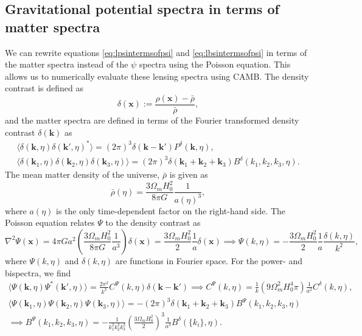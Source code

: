\documentclass[11pt]{article} %
\newcommand{\br}[1]{\ensuremath{\left( #1 \right)}}
\begin{document}
\subsection{Gravitational potential spectra in terms of matter spectra}
We can rewrite equations \ref{eq:lpsintermsofpsi} and \ref{eq:lbsintermsofpsi} in terms of the matter spectra instead of the $\psi$ spectra using the Poisson equation. This allows us to numerically evaluate these lensing spectra using CAMB. The density contrast is defined as
\begin{equation}
    \delta(\mathbf x) := \frac{\rho(\mathbf x)-\bar \rho}{\bar\rho},
\end{equation}
and the matter spectra are defined in terms of the Fourier transformed density contrast $\delta(\mathbf k)$ as 
\begin{gather*}
    \langle \delta(\mathbf k, \eta) \delta(\mathbf k', \eta)^* \rangle = (2\pi)^3\delta(\mathbf k - \mathbf k')P^\delta(\mathbf k, \eta),\\
    \langle \delta(\mathbf k_1, \eta) \delta(\mathbf k_2, \eta) \delta(\mathbf k_3, \eta) \rangle = (2\pi)^3\delta(\mathbf k_1 + \mathbf k_2 + \mathbf k_3)B^\delta(k_1, k_2, k_3, \eta).
\end{gather*}
The mean matter density of the universe, \( \bar{\rho} \) is given as 
$$
\bar{\rho}(\eta) = \frac{3 \Omega_m H_0^2}{8 \pi G}\frac{1}{a(\eta)^3},
$$
where $a(\eta)$ is the only time-dependent factor on the right-hand side.
The Poisson equation relates $\Psi$ to the density contrast as \cite{dodelson2020modern}
\begin{equation}
    \nabla^2\Psi(\mathbf x) = 4\pi G a^2\br{\frac{3\Omega_m H_0^2}{8\pi G}\frac{1}{a^3}}\delta(\mathbf x) = \frac{3\Omega_m H_0^2}{2} \frac{1}{a}\delta(\mathbf x) \implies \Psi(k, \eta) = -\frac{3\Omega_m H_0^2}{2}\frac{1}{a}\frac{\delta(k, \eta)}{k^2},
\end{equation}
where $\Psi(k,\eta)$ and $\delta(k,\eta)$ are functions in Fourier space. For the power- and bispectra, we find
\begin{gather*}
    \langle \Psi(\mathbf k, \eta)\Psi^*(\mathbf k',\eta)\rangle = \frac{2\pi^2}{k^3}C^\Psi(k, \eta)\delta(\mathbf k - \mathbf k') \implies C^\Psi(k,\eta) = \frac{1}{k}(9\Omega_m^2H_0^4\pi) \frac{1}{a^2}C^\delta(k,\eta),\\
    \langle \Psi(\mathbf k_1, \eta)\Psi(\mathbf k_2,\eta)\Psi(\mathbf k_3,\eta)\rangle = -(2\pi)^3\delta(\mathbf k_1 + \mathbf k_2 + \mathbf k_3)B^\Psi(k_1,k_2,k_3, \eta)\\ 
    \implies B^\Psi(k_1,k_2,k_3, \eta) = -\frac{1}{k_1^2k_2^2k_3^2}\br{\frac{3\Omega_m H_0^2}{2}}^3 \frac{1}{a^3}B^\delta(\{k_i\}, \eta).
\end{gather*}
\end{document}

